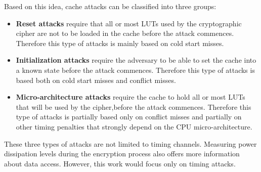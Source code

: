\documentclass[twocolumn]{IEEEtran}
\begin{document}
Based on this idea, cache attacks can be classified into three groups:

\begin {itemize}

\item \textbf{Reset attacks} require that all or most LUTs used by the cryptographic cipher are not to be loaded in the cache before the attack commences. Therefore this type of attacks is mainly based on cold start misses.

\item \textbf{Initialization attacks} require the adversary to be able to set the cache into a known state before the attack commences. Therefore this type of attacks is based both on cold start misses and conflict misses.

\item \textbf{Micro-architecture attacks} require the cache to hold all or most LUTs that will be used by the cipher,before the attack commences. Therefore this type of attacks is partially based only on conflict misses and partially on other timing penalties that
strongly depend on the CPU micro-architecture. 

\end {itemize}

These three types of attacks are not limited to timing channels. Measuring power dissipation levels during the encryption process also offers more information about data access. However, this work would focus only on timing attacks.



\end{document}
